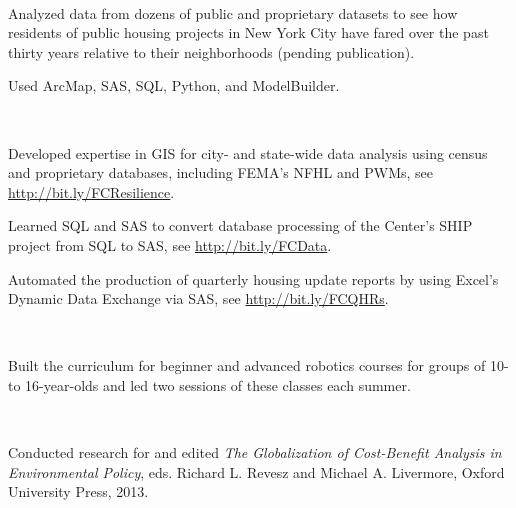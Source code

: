 \documentclass[]{deedy-resume-openfont}
\begin{document}
\begin{minipage}[t]{0.66\textwidth}
 \\
\begin{tightemize}
\item Analyzed data from dozens of public and proprietary datasets to see how residents of public housing projects in New York City have fared over the past thirty years relative to their neighborhoods (pending publication). 
\item Used ArcMap, SAS, SQL, Python, and ModelBuilder.
\end{tightemize}

\vspace{\topsep}
 \\
\begin{tightemize}
\item Developed expertise in GIS for city- and state-wide data analysis using census and proprietary databases, including FEMA’s NFHL and PWMs, see \url{http://bit.ly/FCResilience}.
\item Learned SQL and SAS to convert database processing of the Center’s SHIP project from SQL to SAS, see \url{http://bit.ly/FCData}.
\item Automated the production of quarterly housing update reports by using Excel's Dynamic Data Exchange via SAS, see \url{http://bit.ly/FCQHRs}.
\end{tightemize}
\sectionsep


 \\
\begin{tightemize}
\item Built the curriculum for beginner and advanced robotics courses for groups of 10- to 16-year-olds and led two sessions of these classes each summer. 
\end{tightemize}
\sectionsep


 \\
\begin{tightemize}
\item Conducted research for and edited \emph{The Globalization of Cost-Benefit Analysis in Environmental Policy}, eds. Richard L. Revesz and Michael A. Livermore, Oxford University Press, 2013.
\end{tightemize}
\sectionsep




\end{minipage}
\end{document}
